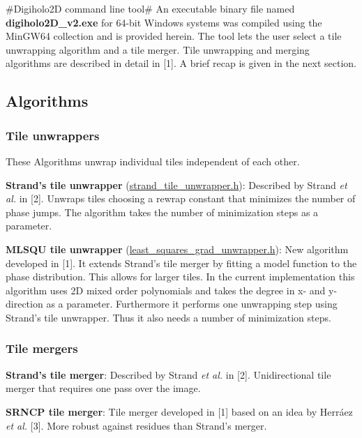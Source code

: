\#\-Digiholo2\-D command line tool\# An executable binary file named {\bfseries digiholo2\-D\-\_\-v2.\-exe} for 64-\/bit Windows systems was compiled using the Min\-G\-W64 collection and is provided herein. The tool lets the user select a tile unwrapping algorithm and a tile merger. Tile unwrapping and merging algorithms are described in detail in \mbox{[}1\mbox{]}. A brief recap is given in the next section.

\subsection*{Algorithms}

\subsubsection*{Tile unwrappers}

These Algorithms unwrap individual tiles independent of each other.

{\bfseries Strand's tile unwrapper} (\hyperlink{strand__tile__unwrapper_8h_source}{strand\-\_\-tile\-\_\-unwrapper.\-h})\-: Described by Strand {\itshape et al.} in \mbox{[}2\mbox{]}. Unwraps tiles choosing a rewrap constant that minimizes the number of phase jumps. The algorithm takes the number of minimization steps as a parameter.

{\bfseries M\-L\-S\-Q\-U tile unwrapper} (\hyperlink{least__squares__grad__unwrapper_8h_source}{least\-\_\-squares\-\_\-grad\-\_\-unwrapper.\-h})\-: New algorithm developed in \mbox{[}1\mbox{]}. It extends Strand's tile merger by fitting a model function to the phase distribution. This allows for larger tiles. In the current implementation this algorithm uses 2\-D mixed order polynomials and takes the degree in x-\/ and y-\/direction as a parameter. Furthermore it performs one unwrapping step using Strand's tile unwrapper. Thus it also needs a number of minimization steps.

\subsubsection*{Tile mergers}

{\bfseries Strand's tile merger}\-: Described by Strand {\itshape et al.} in \mbox{[}2\mbox{]}. Unidirectional tile merger that requires one pass over the image.

{\bfseries S\-R\-N\-C\-P tile merger}\-: Tile merger developed in \mbox{[}1\mbox{]} based on an idea by Herráez {\itshape et al.} \mbox{[}3\mbox{]}. More robust against residues than Strand's merger.

